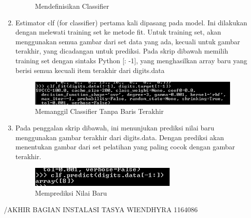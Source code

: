 \begin{enumerate}
\begin{figure}
\begin{center}
   	 \caption{Mendefinisikan Classifier }	
	\end{center}
\end{figure}
\item
Estimator clf (for classifier) pertama kali dipasang pada model. Ini dilakukan dengan melewati training set ke metode fit. Untuk training set, akan menggunakan semua gambar dari set data yang ada, kecuali untuk gambar terakhir, yang dicadangan untuk prediksi. Pada skrip dibawah memilih training set dengan sintaks Python [: -1], yang menghasilkan array baru yang berisi semua kecuali item terakhir dari digits.data
\begin{figure}
	\begin{center}
   	 \includegraphics[scale=1]{figures/tasya4.png}
   	 \caption{Memanggil Classifier Tanpa Baris Terakhir }	
	\end{center}
\end{figure}
\item
Pada penggalan skrip dibawah, ini menunjukan prediksi nilai baru menggunakan gambar terakhir dari digits.data. Dengan prediksi akan menentukan gambar dari set pelatihan yang paling cocok dengan gambar terakhir.
\begin{figure}
	\begin{center}
   	 \includegraphics[scale=1]{figures/tasya5.png}
   	 \caption{Memprediksi Nilai Baru}	
	\end{center}
\end{figure}
\end{enumerate}
/AKHIR BAGIAN INSTALASI TASYA WIENDHYRA 1164086


